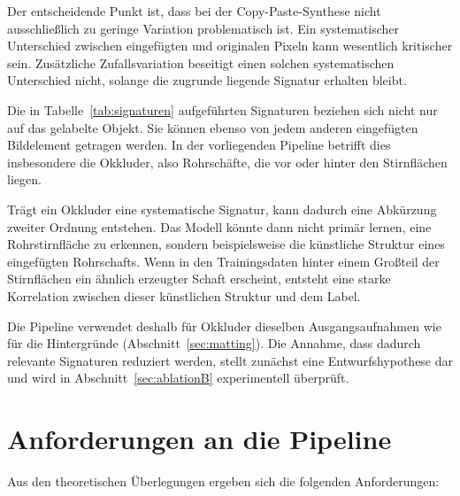 Der entscheidende Punkt ist, dass bei der Copy-Paste-Synthese nicht ausschließlich zu geringe Variation problematisch ist. Ein systematischer Unterschied zwischen eingefügten und originalen Pixeln kann wesentlich kritischer sein. Zusätzliche Zufallsvariation beseitigt einen solchen systematischen Unterschied nicht, solange die zugrunde liegende Signatur erhalten bleibt.


Die in Tabelle~\ref{tab:signaturen} aufgeführten Signaturen beziehen sich nicht nur auf das gelabelte Objekt. Sie können ebenso von jedem anderen eingefügten Bildelement getragen werden. In der vorliegenden Pipeline betrifft dies insbesondere die Okkluder, also Rohrschäfte, die vor oder hinter den Stirnflächen liegen.

Trägt ein Okkluder eine systematische Signatur, kann dadurch eine Abkürzung zweiter Ordnung entstehen. Das Modell könnte dann nicht primär lernen, eine Rohrstirnfläche zu erkennen, sondern beispielsweise die künstliche Struktur eines eingefügten Rohrschafts. Wenn in den Trainingsdaten hinter einem Großteil der Stirnflächen ein ähnlich erzeugter Schaft erscheint, entsteht eine starke Korrelation zwischen dieser künstlichen Struktur und dem Label.

Die Pipeline verwendet deshalb für Okkluder dieselben Ausgangsaufnahmen wie für die Hintergründe (Abschnitt~\ref{sec:matting}). Die Annahme, dass dadurch relevante Signaturen reduziert werden, stellt zunächst eine Entwurfshypothese dar und wird in Abschnitt~\ref{sec:ablationB} experimentell überprüft.

\section{Anforderungen an die Pipeline}
\label{sec:anforderungen}

Aus den theoretischen Überlegungen ergeben sich die folgenden Anforderungen:

